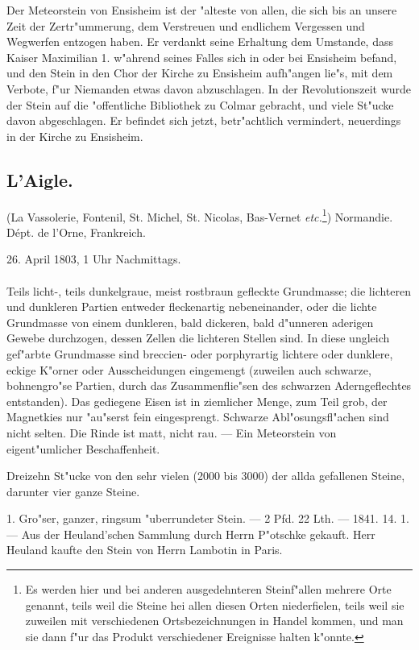 \documentclass[a4paper, 11pt, oneside, polutonikogreek, german]{article}
\begin{document}
Der Meteorstein von Ensisheim ist der "alteste von allen, die sich bis an unsere Zeit der Zertr"ummerung, dem Verstreuen und endlichem Vergessen und Wegwerfen entzogen haben. Er verdankt seine Erhaltung dem Umstande, dass Kaiser Maximilian 1. w"ahrend seines Falles sich in oder bei Ensisheim befand, und den Stein in den Chor der Kirche zu Ensisheim aufh"angen lie"s, mit dem Verbote, f"ur Niemanden etwas davon abzuschlagen. In der Revolutionszeit wurde der Stein auf die "offentliche Bibliothek zu Colmar gebracht, und viele St"ucke davon abgeschlagen. Er befindet sich jetzt, betr"achtlich vermindert, neuerdings in der Kirche zu Ensisheim.
\subsection{L'Aigle.}
\begin{center}
\small
(La Vassolerie, Fontenil, St. Michel, St. Nicolas, Bas-Vernet \emph{etc.}\footnote{Es werden hier und bei anderen ausgedehnteren Steinf"allen mehrere Orte genannt, teils weil die Steine hei allen diesen Orten niederfielen, teils weil sie zuweilen mit verschiedenen Ortsbezeichnungen in Handel kommen, und man sie dann f"ur das Produkt verschiedener Ereignisse halten k"onnte.}) Normandie. Dépt. de l'Orne, Frankreich.

26. April 1803, 1 Uhr Nachmittags.
\end{center}
\paragraph{}
Teils licht-, teils dunkelgraue, meist rostbraun gefleckte Grundmasse; die lichteren und dunkleren Partien entweder fleckenartig nebeneinander, oder die lichte Grundmasse von einem dunkleren, bald dickeren, bald d"unneren aderigen Gewebe durchzogen, dessen Zellen die lichteren Stellen sind. In diese ungleich gef"arbte Grundmasse sind breccien- oder porphyrartig lichtere oder dunklere, eckige K"orner oder Ausscheidungen eingemengt (zuweilen auch schwarze, bohnengro"se Partien, durch das Zusammenflie"sen des schwarzen Aderngeflechtes entstanden). Das gediegene Eisen ist in ziemlicher Menge, zum Teil grob, der Magnetkies nur "au"serst fein eingesprengt. Schwarze Abl"osungsfl"achen sind nicht selten. Die Rinde ist matt, nicht rau. --- Ein Meteorstein von eigent"umlicher Beschaffenheit.

Dreizehn St"ucke von den sehr vielen (2000 bis 3000) der allda gefallenen Steine, darunter vier ganze Steine.

1. Gro"ser, ganzer, ringsum "uberrundeter Stein. --- 2 Pfd. 22 Lth. --- 1841. 14. 1. --- Aus der Heuland'schen Sammlung durch Herrn P"otschke gekauft. Herr Heuland kaufte den Stein von Herrn Lambotin in Paris.
\end{document}
